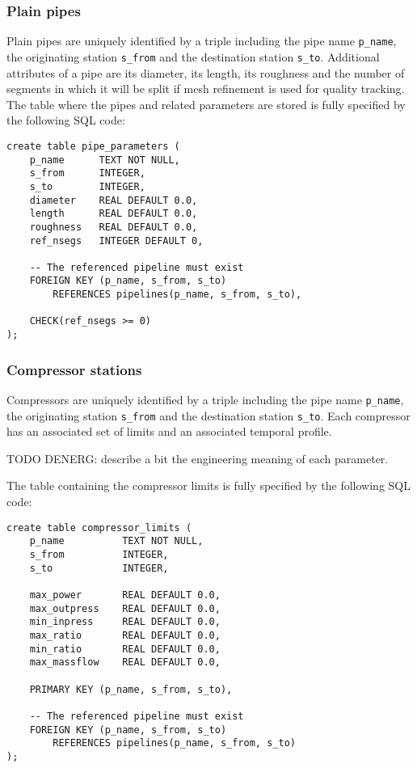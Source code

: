 \documentclass[10pt]{article}
\begin{document}
\subsubsection{Plain pipes}
Plain pipes are uniquely identified by a triple including the pipe
name \texttt{p\_name}, the originating station \texttt{s\_from} and the destination
station \texttt{s\_to}. Additional attributes of a pipe are its diameter,
its length, its roughness and the number of segments in which it will be split
if mesh refinement is used for quality tracking. The table where the pipes and
related parameters are stored is fully specified by the following SQL code:
\begin{verbatim}
create table pipe_parameters (
    p_name      TEXT NOT NULL,
    s_from      INTEGER,
    s_to        INTEGER,
    diameter    REAL DEFAULT 0.0,
    length      REAL DEFAULT 0.0,
    roughness   REAL DEFAULT 0.0,
    ref_nsegs   INTEGER DEFAULT 0,

    -- The referenced pipeline must exist
    FOREIGN KEY (p_name, s_from, s_to)
        REFERENCES pipelines(p_name, s_from, s_to),

    CHECK(ref_nsegs >= 0)
);
\end{verbatim}
\subsubsection{Compressor stations}
Compressors are uniquely identified by a triple including the pipe
name \texttt{p\_name}, the originating station \texttt{s\_from} and the destination
station \texttt{s\_to}. Each compressor has an associated set of limits and an
associated temporal profile.

TODO DENERG: describe a bit the engineering meaning of each parameter.

The table containing the compressor limits is fully specified by the following
SQL code:
\begin{verbatim}
create table compressor_limits (
    p_name          TEXT NOT NULL,
    s_from          INTEGER,
    s_to            INTEGER,

    max_power       REAL DEFAULT 0.0,
    max_outpress    REAL DEFAULT 0.0,
    min_inpress     REAL DEFAULT 0.0,
    max_ratio       REAL DEFAULT 0.0,
    min_ratio       REAL DEFAULT 0.0,
    max_massflow    REAL DEFAULT 0.0,

    PRIMARY KEY (p_name, s_from, s_to),

    -- The referenced pipeline must exist
    FOREIGN KEY (p_name, s_from, s_to)
        REFERENCES pipelines(p_name, s_from, s_to)
);
\end{verbatim}
\end{document}
